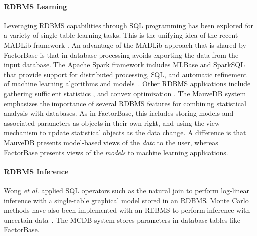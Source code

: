 \documentclass{sfuthesis}
\begin{document}
\paragraph{RDBMS Learning}
Leveraging RDBMS capabilities through SQL programming has been explored for a variety of single-table learning tasks. This is the unifying idea of the recent MADLib framework \cite{MADlib_VLDB_2012}. An advantage of the MADLib approach that is shared by FactorBase  is that in-database processing avoids exporting the data from the input database. The Apache Spark \cite{Committers} framework includes MLBase and SparkSQL that provide support for distributed processing, SQL, and automatic refinement of machine learning algorithms and models~\cite{MLbase_ICDR_2013}.
Other RDBMS applications include gathering sufficient statistics \cite{Graefe1998}, and convex optimization \cite{Feng_SIGMOD_2012}. The MauveDB system \cite{Deshpande2006} emphasizes the importance of several RDBMS features for combining statistical analysis with databases.
As in {\sc FactorBase}, this includes 
storing models and associated parameters as objects in their own right, 
and using the view mechanism to update statistical objects as the data change.
A difference is that MauveDB presents model-based views of the {\em data} to the user, whereas FactorBase  presents views of the {\em models} to machine learning applications. 

\paragraph{RDBMS Inference}
Wong {\em et al.}  applied SQL operators such as the natural join to perform log-linear inference with a single-table graphical model \cite{Wong1995} stored in an RDBMS. 
Monte Carlo methods have also been implemented with an RDBMS  to perform inference with uncertain data~\cite{MCDB_SIGMOD_2008,Wick_VLDB_2010}.
The MCDB system \cite{MCDB_SIGMOD_2008}  stores parameters in database tables like FactorBase. 
\end{document}
